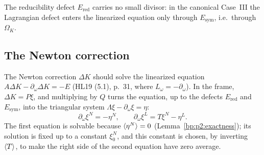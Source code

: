 The reducibility defect $E_{\mathrm{red}}$ carries no small divisor: in the canonical Case~III the
Lagrangian defect enters the linearized equation only through $E_{\mathrm{sym}}$, i.e.\ through
$\Omega_K$.

\subsection{The Newton correction}\label{bp:p2:sec-correction}

The Newton correction $\Delta K$ should solve the linearized equation $A\Delta K-\partial_\omega\Delta
K=-E$ (HL19 (5.1), p.~31, where $L_\omega=-\partial_\omega$). In the frame, $\Delta K=P\xi$, and
multiplying by $Q$ turns the equation, up to the defects $E_{\mathrm{red}}$ and $E_{\mathrm{sym}}$, into the
triangular system $\Lambda\xi-\partial_\omega\xi=\eta$:
\[
\partial_\omega\xi^N=-\eta^N,\qquad\partial_\omega\xi^L=T\xi^N-\eta^L.
\]
The first equation is solvable because $\langle \eta^N\rangle=0$ (Lemma~\ref{bp:p2:exactness}); its solution is
fixed up to a constant $\xi^N_0$, and this constant is chosen, by inverting $\langle T\rangle$, to make the right
side of the second equation have zero average.

